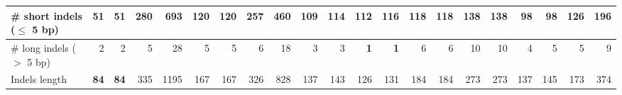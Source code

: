 \documentclass[12pt,a4paper]{article}
\begin{document}
\begin{table}[ht]
\begin{center}
\begin{tabular}{|l*{20}{|r}|}
\hspace{5mm}\# short indels ($\leq$ 5 bp) & {\bf 51} & {\bf 51} & 280 & 693 & 120 & 120 & 257 & 460 & 109 & 114 & 112 & 116 & 118 & 118 & 138 & 138 & 98 & 98 & 126 & 196 \\ \hline
\hspace{5mm}\# long indels ($>$ 5 bp) & 2 & 2 & 5 & 28 & 5 & 5 & 6 & 18 & 3 & 3 & {\bf 1} & {\bf 1} & 6 & 6 & 10 & 10 & 4 & 5 & 5 & 9 \\ \hline
Indels length & {\bf 84} & {\bf 84} & 335 & 1195 & 167 & 167 & 326 & 828 & 137 & 143 & 126 & 131 & 184 & 184 & 273 & 273 & 137 & 145 & 173 & 374 \\ \hline
\end{tabular}
\end{center}
\end{table}
\end{document}
